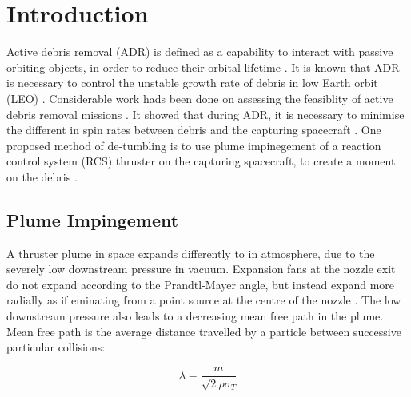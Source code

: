 \documentclass[journal]{new-aiaa}
\begin{document}
\twocolumn
\section{Introduction}
\label{sec-introduction}


Active debris removal (ADR) is defined as a capability to interact with passive orbiting objects, in order to reduce their orbital lifetime \cite{steeringgroupIADCStatementActive2022a}. It is known that ADR is necessary to control the unstable growth rate of debris in low Earth orbit (LEO) \cite{inter-agencyspacedebriscoordinationcommitteePeacefulUsesOuter1993} \cite{bastidavirgiliActiveDebrisRemoval2013}. Considerable work hads been done on assessing the feasiblity of active debris removal missions \cite{ledkovReviewContactContactless2022,bonnalActiveDebrisRemoval2013}. It showed that during ADR, it is necessary to minimise the different in spin rates between debris and the capturing spacecraft \cite{shanReviewComparisonActive2016}. One proposed method of de-tumbling is to use plume impinegement of a reaction control system (RCS) thruster on the capturing spacecraft, to create a moment on the debris \cite{peters2016applicability,ferrariGASPLUMEIMPINGEMENT2014}. 

\subsection{Plume Impingement}

A thruster plume in space expands differently to in atmosphere, due to the severely low downstream pressure in vacuum. Expansion fans at the nozzle exit do not expand according to the Prandtl-Mayer angle, but instead expand more radially as if eminating from a point source at the centre of the nozzle \cite{mehtaUnderexpandedSupersonicPlume2011}. The low downstream pressure also leads to a decreasing mean free path in the plume. Mean free path is the average distance travelled by a particle between successive particular collisions:

\begin{equation}
  \lambda = \frac{m}{\sqrt{2} \rho {\sigma}_T} 
  \label{intro_eq_meanFreePath}
\end{equation}
\end{document}
